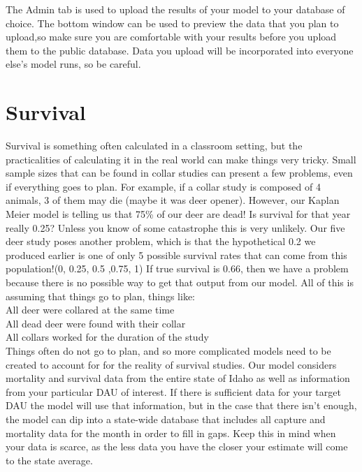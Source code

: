 \documentclass[
]{book}
\begin{document}
The Admin tab is used to upload the results of your model to your database of choice. The bottom window can be used to preview the data that you plan to upload,so make sure you are comfortable with your results before you upload them to the public database. Data you upload will be incorporated into everyone else's model runs, so be careful.

\hypertarget{surv}{%
\chapter{Survival}\label{surv}}

Survival is something often calculated in a classroom setting, but the practicalities of calculating it in the real world can make things very tricky. Small sample sizes that can be found in collar studies can present a few problems, even if everything goes to plan. For example, if a collar study is composed of 4 animals, 3 of them may die (maybe it was deer opener). However, our Kaplan Meier model is telling us that 75\% of our deer are dead! Is survival for that year really 0.25? Unless you know of some catastrophe this is very unlikely. Our five deer study poses another problem, which is that the hypothetical 0.2 we produced earlier is one of only 5 possible survival rates that can come from this population!(0, 0.25, 0.5 ,0.75, 1) If true survival is 0.66, then we have a problem because there is no possible way to get that output from our model. All of this is assuming that things go to plan, things like:\\

All deer were collared at the same time\\
All dead deer were found with their collar\\
All collars worked for the duration of the study\\

Things often do not go to plan, and so more complicated models need to be created to account for for the reality of survival studies. Our model considers mortality and survival data from the entire state of Idaho as well as information from your particular DAU of interest. If there is sufficient data for your target DAU the model will use that information, but in the case that there isn't enough, the model can dip into a state-wide database that includes all capture and mortality data for the month in order to fill in gaps. Keep this in mind when your data is scarce, as the less data you have the closer your estimate will come to the state average.
\end{document}
